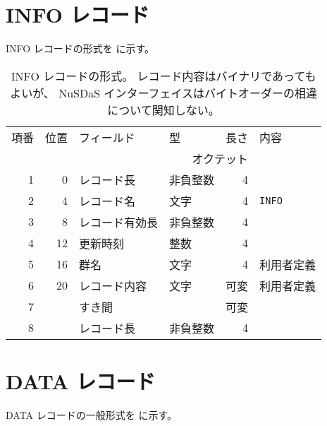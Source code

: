 \newpage
\section{INFO レコード}
\label{sec:fmt.subc}

INFO レコードの形式を  に示す。

\begin{table}[htp]
 \begin{center}
 \begin{tabular}{rr|llrl}
 \hline
 項番 & 位置 & フィールド & 型 & 長さ & 内容 \\
      &      &            & \multicolumn{2}{r}{オクテット} &  \\
 \hline
 1 & 0 & レコード長 & 非負整数 & 4 & \\
 2 & 4 & レコード名 & 文字 & 4 & {\tt INFO} \\
 3 & 8 & レコード有効長 & 非負整数 & 4 & \\
 4 & 12 & 更新時刻 & 整数 & 4 & \\
 \hline
 5 & 16 & 群名 & 文字 & 4 & 利用者定義 \\
 6 & 20 & レコード内容 & 文字 & 可変 & 利用者定義 \\
 \hline
 7 &  & すき間 & & 可変 &  \\
 8 &  & レコード長 & 非負整数 & 4 &  \\
 \hline
 \end{tabular}
 \end{center}
 \caption[INFO レコードの形式]{%
  INFO レコードの形式。
  レコード内容はバイナリであってもよいが、
  NuSDaS インターフェイスはバイトオーダーの相違について関知しない。
 }
 \label{table.fmt.info}
\end{table}

\newpage
\section{DATA レコード}
\label{sec:fmt.subc}

DATA レコードの一般形式を  に示す。

